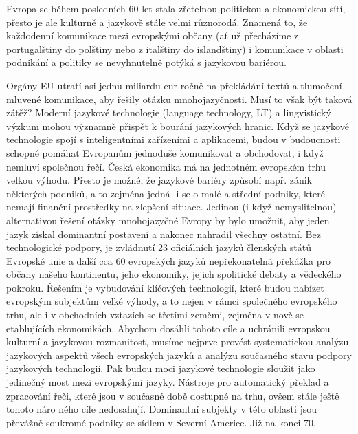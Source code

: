 \documentclass[]{../../metanetpaper}
\begin{document}
\begin{multicols}{2}
    
Evropa se během posledních 60 let stala zřetelnou politickou a ekonomickou sítí, přesto je ale kulturně a jazykově stále velmi různorodá. Znamená to, že každodenní komunikace mezi evropskými občany (ať už přecházíme z portugalštiny do polštiny nebo z italštiny do islandštiny) i komunikace v oblasti podnikání a politiky se nevyhnutelně potýká s jazykovou bariérou.


Orgány EU utratí asi jednu miliardu eur ročně na překládání textů a tlumočení mluvené komunikace, aby řešily otázku mnohojazyčnosti. Musí to však být taková zátěž? Moderní jazykové technologie (language technology, LT) a lingvistický výzkum mohou významně přispět k bourání jazykových hranic. Když se jazykové technologie spojí s inteligentními zařízeními a aplikacemi, budou v budoucnosti schopné pomáhat Evropanům jednoduše komunikovat a obchodovat, i když nemluví společnou řečí.
Česká ekonomika má na jednotném evropském trhu velkou výhodu. Přesto je možné, že jazykové bariéry způsobí např. zánik některých podniků, a to zejména jedná-li se o malé a střední podniky, které nemají finanční prostředky na zlepšení situace. Jedinou (i když nemyslitelnou) alternativou řešení otázky mnohojazyčné Evropy by bylo umožnit, aby jeden jazyk získal dominantní postavení a nakonec nahradil všechny ostatní.
Bez technologické podpory, je zvládnutí 23 oficiálních jazyků členských států Evropské unie a další cca 60 evropských jazyků nepřekonatelná překážka pro občany našeho kontinentu, jeho ekonomiky, jejich spolitické debaty a vědeckého pokroku.
Řešením je vybudování klíčových technologií, které budou nabízet evropským subjektům velké výhody, a to nejen v rámci společného evropského trhu, ale i v obchodních vztazích se třetími zeměmi, zejména v nově se etablujících ekonomikách. Abychom dosáhli tohoto cíle a uchránili evropskou kulturní a jazykovou rozmanitost, musíme nejprve provést systematickou analýzu jazykových aspektů všech evropských jazyků a analýzu současného stavu podpory jazykových technologií. Pak budou moci jazykové technologie sloužit jako jedinečný most mezi evropskými jazyky. Nástroje pro automatický překlad a zpracování řeči, které jsou v současné době dostupné na trhu, ovšem stále ještě tohoto náro ného cíle nedosahují. Dominantní subjekty v této oblasti jsou převážně soukromé podniky se sídlem v Severní Americe. Již na konci 70. 


\end{multicols}
\end{document}
